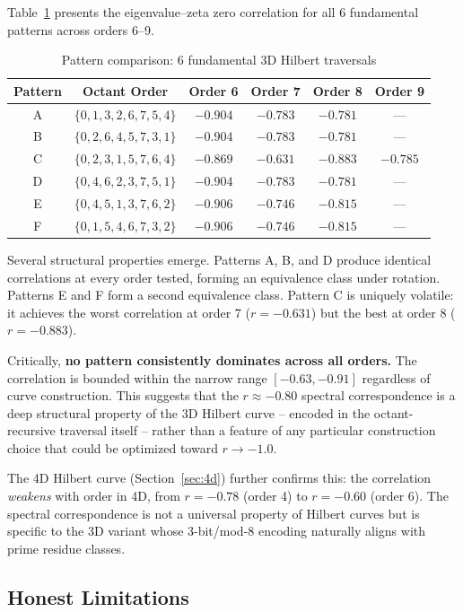 \documentclass[11pt,a4paper]{article}
\begin{document}
Table~\ref{tab:patterns} presents the eigenvalue--zeta zero correlation
for all 6 fundamental patterns across orders 6--9.

\begin{table}[h]
\centering
\caption{Pattern comparison: 6 fundamental 3D Hilbert traversals}
\label{tab:patterns}
\begin{tabular}{cccccc}
\toprule
Pattern & Octant Order & Order 6 & Order 7 & Order 8 & Order 9 \\
\midrule
A & $\{0,1,3,2,6,7,5,4\}$ & $-0.904$ & $-0.783$ & $-0.781$ & --- \\
B & $\{0,2,6,4,5,7,3,1\}$ & $-0.904$ & $-0.783$ & $-0.781$ & --- \\
C & $\{0,2,3,1,5,7,6,4\}$ & $-0.869$ & $-0.631$ & \textbf{$-0.883$} & $-0.785$ \\
D & $\{0,4,6,2,3,7,5,1\}$ & $-0.904$ & $-0.783$ & $-0.781$ & --- \\
E & $\{0,4,5,1,3,7,6,2\}$ & $-0.906$ & $-0.746$ & $-0.815$ & --- \\
F & $\{0,1,5,4,6,7,3,2\}$ & $-0.906$ & $-0.746$ & $-0.815$ & --- \\
\bottomrule
\end{tabular}
\end{table}

Several structural properties emerge.  Patterns A, B, and D produce
identical correlations at every order tested, forming an equivalence
class under rotation.  Patterns E and F form a second equivalence class.
Pattern C is uniquely volatile: it achieves the worst correlation at
order 7 ($r = -0.631$) but the best at order 8 ($r = -0.883$).

Critically, \textbf{no pattern consistently dominates across all orders.}
The correlation is bounded within the narrow range $[-0.63, -0.91]$
regardless of curve construction.  This suggests that the $r \approx
-0.80$ spectral correspondence is a deep structural property of the
3D Hilbert curve -- encoded in the octant-recursive traversal itself --
rather than a feature of any particular construction choice that could
be optimized toward $r \to -1.0$.

The 4D Hilbert curve (Section~\ref{sec:4d}) further confirms this: the
correlation \emph{weakens} with order in 4D, from $r = -0.78$ (order 4)
to $r = -0.60$ (order 6).  The spectral correspondence is not a universal
property of Hilbert curves but is specific to the 3D variant whose
3-bit/mod-8 encoding naturally aligns with prime residue classes.
\n\n\subsection{Honest Limitations}
\end{document}
